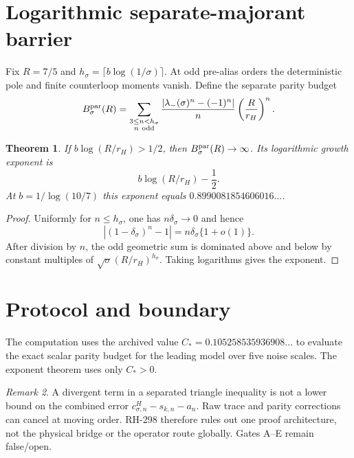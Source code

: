\documentclass[11pt]{article}
\newtheorem{theorem}{Theorem}[section]
\theoremstyle{remark}\newtheorem{remark}[theorem]{Remark}
\begin{document}
\section{Logarithmic separate-majorant barrier}
Fix $R=7/5$ and $h_\sigma=\lceil b\log(1/\sigma)\rceil$.  At odd pre-alias
orders the deterministic pole and finite counterloop moments vanish.  Define
the separate parity budget
\[
 B_\sigma^{\rm par}(R)=
 \sum_{\substack{3\le n<h_\sigma\\n\ {\rm odd}}}
 \frac{|\lambda_-(\sigma)^n-(-1)^n|}{n}
 \left(\frac R{r_H}\right)^n.
\]
\begin{theorem}\label{thm:majorant}
If $b\log(R/r_H)>1/2$, then
$B_\sigma^{\rm par}(R)\to\infty$.  Its logarithmic growth exponent is
\[
 b\log(R/r_H)-\frac12.
\]
At $b=1/\log(10/7)$ this exponent equals
$0.8990081854606016\ldots$.
\end{theorem}
\begin{proof}
Uniformly for $n\le h_\sigma$, one has
$n\delta_\sigma\to0$ and hence
\[
 |(1-\delta_\sigma)^n-1|
 =n\delta_\sigma\{1+o(1)\}.
\]
After division by $n$, the odd geometric sum is dominated above and below
by constant multiples of
$\sqrt\sigma(R/r_H)^{h_\sigma}$.  Taking logarithms gives the exponent.
\end{proof}

\section{Protocol and boundary}
The computation uses the archived value
$C_*=0.105258535936908\ldots$ to evaluate the exact scalar parity budget for
the leading model over five noise scales.  The exponent theorem uses only
$C_*>0$.

\begin{remark}
A divergent term in a separated triangle inequality is not a lower bound on
the combined error $c^H_{\sigma,n}-s_{k,n}-a_n$.  Raw trace and parity
corrections can cancel at moving order.  RH-298 therefore rules out one
proof architecture, not the physical bridge or the operator route globally.
Gates A--E remain false/open.
\end{remark}
\end{document}
